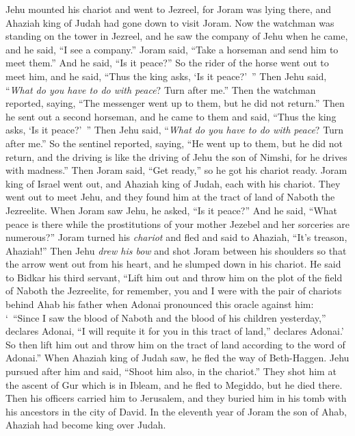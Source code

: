 \begin{biblechapter}
\verse Jehu mounted his chariot and went to Jezreel, for Joram was lying there, and Ahaziah king of Judah had gone down to visit Joram.
\verse Now the watchman was standing on the tower in Jezreel, and he saw the company of Jehu when he came, and he said, “I see a company.” Joram said, “Take a horseman and send him to meet them.” And he said, “Is it peace?”
\verse So the rider of the horse went out to meet him, and he said, “Thus the king asks, ‘Is it peace?’ ” Then Jehu said, “\textit{What do you have to do with peace}? Turn after me.” Then the watchman reported, saying, “The messenger went up to them, but he did not return.”
\verse Then he sent out a second horseman, and he came to them and said, “Thus the king asks, ‘Is it peace?’ ” Then Jehu said, “\textit{What do you have to do with peace}? Turn after me.”
\verse So the sentinel reported, saying, “He went up to them, but he did not return, and the driving is like the driving of Jehu the son of Nimshi, for he drives with madness.”
\verse Then Joram said, “Get ready,” so he got his chariot ready. Joram king of Israel went out, and Ahaziah king of Judah, each with his chariot. They went out to meet Jehu, and they found him at the tract of land of Naboth the Jezreelite.
\verse When Joram saw Jehu, he asked, “Is it peace?” And he said, “What peace is there while the prostitutions of your mother Jezebel and her sorceries are numerous?”
\verse Joram turned his \textit{chariot} and fled and said to Ahaziah, “It’s treason, Ahaziah!”
\verse Then Jehu \textit{drew his bow} and shot Joram between his shoulders so that the arrow went out from his heart, and he slumped down in his chariot.
\verse He said to Bidkar his third servant, “Lift him out and throw him on the plot of the field of Naboth the Jezreelite, for remember, you and I were with the pair of chariots behind Ahab his father when Adonai pronounced this oracle against him:
\verse ‘ “Since I saw the blood of Naboth and the blood of his children yesterday,” declares Adonai, “I will requite it for you in this tract of land,” declares Adonai.’ So then lift him out and throw him on the tract of land according to the word of Adonai.”
 When Ahaziah king of Judah saw, he fled the way of Beth-Haggen. Jehu pursued after him and said, “Shoot him also, in the chariot.” They shot him at the ascent of Gur which is in Ibleam, and he fled to Megiddo, but he died there.
\verse Then his officers carried him to Jerusalem, and they buried him in his tomb with his ancestors in the city of David.
\verse In the eleventh year of Joram the son of Ahab, Ahaziah had become king over Judah.

\end{biblechapter}

